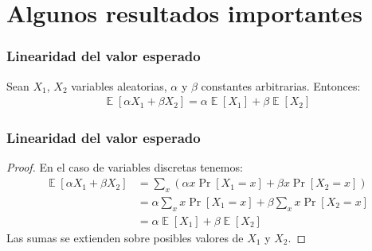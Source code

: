 \documentclass[english, spanish, fleqn,%
hyperref = {colorlinks, urlcolor = blue}%
]{beamer}
\DeclareMathOperator{\Exp}{\mathbb{E}}
\begin{document}
\section{Algunos resultados importantes}

\begin{frame}
  \setcounter{beamerpauses}{2}
  \frametitle{Linearidad del valor esperado}

  \begin{theorem}
    \label{theo:E-lineal}
    Sean \(X_1\), \(X_2\) variables aleatorias,
    \(\alpha\) y \(\beta\) constantes arbitrarias.
    Entonces:
    \begin{align*}
      \Exp[\alpha X_1 + \beta X_2]
        = \alpha \Exp[X_1] + \beta \Exp[X_2]
    \end{align*}
  \end{theorem}
\end{frame}

\begin{frame}
  \setcounter{beamerpauses}{2}
  \frametitle{Linearidad del valor esperado}

  \begin{proof}
    En el caso de variables discretas tenemos:
    \begin{align*}
      \Exp[ \alpha X_1 + \beta X_2 ]
        &= \sum_x
             (\alpha x \Pr[X_1 = x] + \beta x \Pr[X_2 = x]) \\
        &= \alpha \sum_x x \Pr[X_1 = x]
             + \beta \sum_x x \Pr[X_2 = x] \\
        &= \alpha \Exp[X_1] + \beta \Exp[X_2]
    \end{align*}
    Las sumas se extienden sobre posibles valores de \(X_1\) y \(X_2\).
  \end{proof}
\end{frame}
\end{document}
